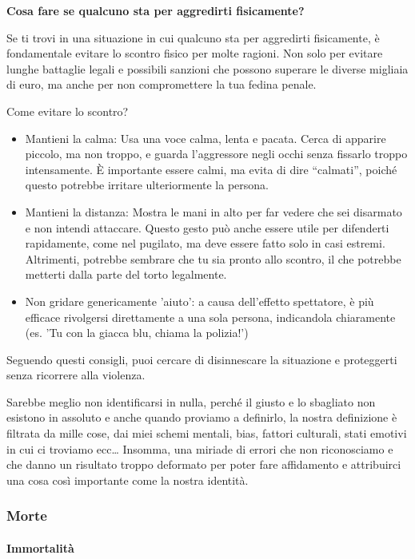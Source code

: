 \documentclass[12pt]{book} %
\begin{document}
\begin{mdframed}[linewidth=1pt]
\textbf{Cosa fare se qualcuno sta per aggredirti fisicamente?}

Se ti trovi in una situazione in cui qualcuno sta per aggredirti fisicamente, è fondamentale evitare lo scontro fisico per molte ragioni. Non solo per evitare lunghe battaglie legali e possibili sanzioni che possono superare le diverse migliaia di euro, ma anche per non compromettere la tua fedina penale.

Come evitare lo scontro?
\begin{itemize}
\item Mantieni la calma: Usa una voce calma, lenta e pacata. Cerca di apparire piccolo, ma non troppo, e guarda l’aggressore negli occhi senza fissarlo troppo intensamente. È importante essere calmi, ma evita di dire “calmati”, poiché questo potrebbe irritare ulteriormente la persona.
\item Mantieni la distanza: Mostra le mani in alto per far vedere che sei disarmato e non intendi attaccare. Questo gesto può anche essere utile per difenderti rapidamente, come nel pugilato, ma deve essere fatto solo in casi estremi. Altrimenti, potrebbe sembrare che tu sia pronto allo scontro, il che potrebbe metterti dalla parte del torto legalmente.
\item Non gridare genericamente 'aiuto': a causa dell'effetto spettatore, è più efficace rivolgersi direttamente a una sola persona, indicandola chiaramente (es. 'Tu con la giacca blu, chiama la polizia!')
\end{itemize}
Seguendo questi consigli, puoi cercare di disinnescare la situazione e proteggerti senza ricorrere alla violenza.
\end{mdframed}

Sarebbe meglio non identificarsi in nulla, perché il giusto e lo sbagliato non esistono in assoluto e anche quando
proviamo a definirlo, la nostra definizione è filtrata da mille cose, dai miei schemi mentali,
bias, fattori culturali, stati emotivi in cui ci troviamo ecc… Insomma, una miriade di errori che non riconosciamo e che
danno un risultato troppo deformato per poter fare affidamento e attribuirci una cosa così importante come la nostra identità.

\subsubsection{Morte}
\paragraph{Immortalità}
\end{document}
